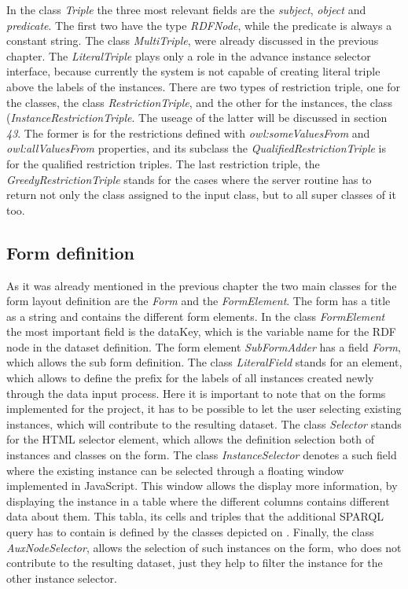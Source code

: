 In the class \textit{Triple} the three most relevant fields are the \textit{subject}, \textit{object} and \textit{predicate}. The first two have the type \textit{RDFNode}, while the predicate is always a constant string. The class \textit{MultiTriple}, were already discussed in the previous chapter. The \textit{LiteralTriple} plays only a role in the advance instance selector interface, because currently the system is not capable of creating literal triple above the labels of the instances. There are two types of restriction triple, one for the classes, the class \textit{RestrictionTriple}, and the other for the instances, the class (\textit{InstanceRestrictionTriple}. The useage of the latter will be discussed in section \textit{43}. The former is for the restrictions defined with \textit{owl:someValuesFrom} and \textit{owl:allValuesFrom} properties, and its subclass the \textit{QualifiedRestrictionTriple} is for the qualified restriction triples. The last restriction triple, the \textit{GreedyRestrictionTriple} stands for the cases where the server routine has to return not only the class assigned to the input class, but to all super classes of it too.

\subsection{Form definition}

As it was already mentioned in the previous chapter the two main classes for the form layout definition are the \textit{Form} and the \textit{FormElement}. The form has a title as a string and contains the different form elements. In the class \textit{FormElement} the most important field is the dataKey, which is the variable name for the RDF node in the dataset definition. The form element \textit{SubFormAdder} has a field \textit{Form}, which allows the sub form definition. The class \textit{LiteralField} stands for an element, which allows to define the prefix for the labels of all instances created newly through the data input process. Here it is important to note that on the forms implemented for the project, it has to be possible to let the user selecting existing instances, which will contribute to the resulting dataset. The class \textit{Selector} stands for the HTML selector element, which allows the definition selection both of instances and classes on the form. The class \textit{InstanceSelector} denotes a such field where the existing instance can be selected through a floating window implemented in JavaScript. This window allows the display more information, by displaying the instance in a table where the different columns contains different data about them. This tabla, its cells and triples that the additional SPARQL query has to contain is defined by the classes depicted on . Finally, the class \textit{AuxNodeSelector}, allows the selection of such instances on the form, who does not contribute to the resulting dataset, just they help to filter the instance for the other instance selector.

